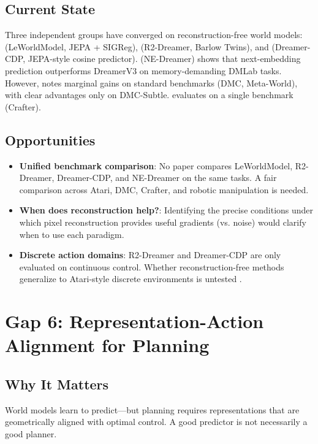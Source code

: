 \documentclass[11pt,a4paper]{article}
\begin{document}
\subsection{Current State}
Three independent groups have converged on reconstruction-free world models: \citet{maes2026leworldmodel} (LeWorldModel, JEPA + SIGReg), \citet{morihira2026r2dreamer} (R2-Dreamer, Barlow Twins), and \citet{hauri2026dreamercdp} (Dreamer-CDP, JEPA-style cosine predictor). \citet{bredis2026nedreamer} (NE-Dreamer) shows that next-embedding prediction outperforms DreamerV3 on memory-demanding DMLab tasks. However, \citet{morihira2026r2dreamer} notes marginal gains on standard benchmarks (DMC, Meta-World), with clear advantages only on DMC-Subtle. \citet{hauri2026dreamercdp} evaluates on a single benchmark (Crafter).

\subsection{Opportunities}
\begin{itemize}[noitemsep]
    \item \textbf{Unified benchmark comparison}: No paper compares LeWorldModel, R2-Dreamer, Dreamer-CDP, and NE-Dreamer on the same tasks. A fair comparison across Atari, DMC, Crafter, and robotic manipulation is needed.
    \item \textbf{When does reconstruction help?}: Identifying the precise conditions under which pixel reconstruction provides useful gradients (vs. noise) would clarify when to use each paradigm.
    \item \textbf{Discrete action domains}: R2-Dreamer and Dreamer-CDP are only evaluated on continuous control. Whether reconstruction-free methods generalize to Atari-style discrete environments is untested \citep{morihira2026r2dreamer}.
\end{itemize}

\section{Gap 6: Representation-Action Alignment for Planning}

\subsection{Why It Matters}
World models learn to predict---but planning requires representations that are geometrically aligned with optimal control. A good predictor is not necessarily a good planner.
\end{document}
